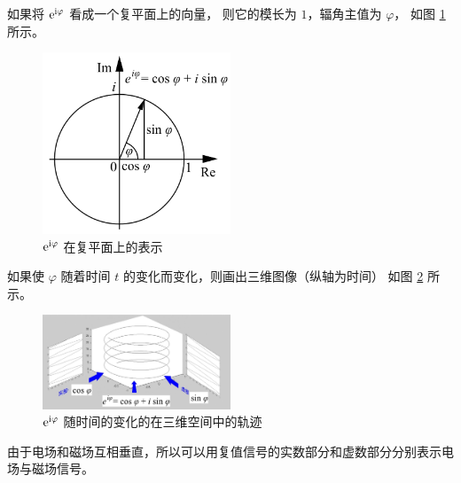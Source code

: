 \begin{example}[复值信号的图示]
    如果将 $\mathrm{e}^{\mathrm{i} \varphi}$ 看成一个复平面上的向量，
    则它的模长为 $1$，辐角主值为 $\varphi$，
    如图 \ref{fig:euler-formula-imaginary-plane} 所示。
    \begin{figure}[H]
        \centering
        \includegraphics[width=0.5\textwidth]{chap1/img/euler-formula-imaginary-plane.png}
        \caption{$\mathrm{e}^{\mathrm{i} \varphi}$ 在复平面上的表示}
        \label{fig:euler-formula-imaginary-plane}
    \end{figure}

    如果使 $\varphi$ 随着时间 $t$ 的变化而变化，则画出三维图像（纵轴为时间）
    如图 \ref{fig:euler-formula-imaginary-signals.png} 所示。
    \begin{figure}[H]
        \centering
        \includegraphics[width=0.5\textwidth]{chap1/img/euler-formula-imaginary-signals.png}
        \caption{$\mathrm{e}^{\mathrm{i} \varphi}$ 随时间的变化的在三维空间中的轨迹}
        \label{fig:euler-formula-imaginary-signals.png}
    \end{figure}
\end{example}

\begin{example}[复值信号在电磁场中的应用]
    由于电场和磁场互相垂直，所以可以用复值信号的实数部分和虚数部分分别表示电场与磁场信号。
\end{example}

